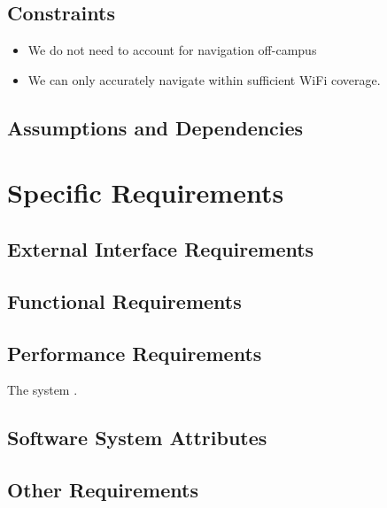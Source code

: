 \documentclass[10pt,a4paper]{article}
\begin{document}
		\subsection{Constraints}

			\begin{itemize}
				\item We do not need to account for navigation off-campus
				\item We can only accurately navigate within sufficient WiFi coverage.

			\end{itemize}

		\subsection{Assumptions and Dependencies}



	\section{Specific Requirements}

		\subsection{External Interface Requirements}

		\subsection{Functional Requirements}

		\subsection{Performance Requirements}

			The system .

		\subsection{Software System Attributes}

		\subsection{Other Requirements}
\end{document}
